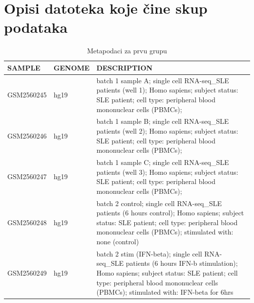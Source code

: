 \documentclass[a4paper]{article}
\begin{document}
\section{Opisi datoteka koje čine skup podataka}
\begin{center}
\begin{table}[H]
\caption{Metapodaci za prvu grupu}
\begin{adjustbox}{width=1\textwidth}
\begin{tabularx}{\textwidth}{llY}
\toprule
     SAMPLE & GENOME &                                                                                                                                                                                                                  DESCRIPTION \\
\midrule
 GSM2560245 &   hg19 &                                                              batch 1 sample A; single cell RNA-seq\_SLE patients (well 1); Homo sapiens; subject status: SLE patient; cell type: peripheral blood mononuclear cells (PBMCs);  \\
 GSM2560246 &   hg19 &                                                              batch 1 sample B; single cell RNA-seq\_SLE patients (well 2); Homo sapiens; subject status: SLE patient; cell type: peripheral blood mononuclear cells (PBMCs);  \\
 GSM2560247 &   hg19 &                                                              batch 1 sample C; single cell RNA-seq\_SLE patients (well 3); Homo sapiens; subject status: SLE patient; cell type: peripheral blood mononuclear cells (PBMCs);  \\
 GSM2560248 &   hg19 &                       batch 2 control; single cell RNA-seq\_SLE patients (6 hours control); Homo sapiens; subject status: SLE patient; cell type: peripheral blood mononuclear cells (PBMCs); stimulated with: none (control) \\
 GSM2560249 &   hg19 &  batch 2 stim (IFN-beta); single cell RNA-seq\_SLE patients (6 hours IFN-b stimulation); Homo sapiens; subject status: SLE patient; cell type: peripheral blood mononuclear cells (PBMCs); stimulated with: IFN-beta for 6hrs \\
\bottomrule
\end{tabularx}
\end{adjustbox}
\label{group1_metadata}
\end{table}
\end{center}
\end{document}
